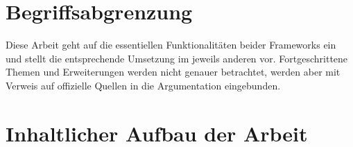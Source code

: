 \section{Begriffsabgrenzung}

Diese Arbeit geht auf die essentiellen Funktionalitäten beider Frameworks ein und stellt die entsprechende Umsetzung im jeweils
anderen vor. Fortgeschrittene Themen und Erweiterungen werden nicht genauer betrachtet, werden aber mit Verweis auf offizielle Quellen
in die Argumentation eingebunden.

\section{Inhaltlicher Aufbau der Arbeit}